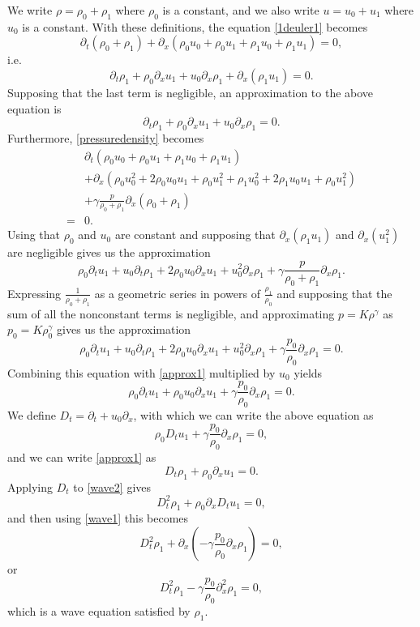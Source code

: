 \documentclass{article}
\theoremstyle{definition}
\begin{document}
We write $\rho=\rho_0+\rho_1$ where $\rho_0$ is a constant, and
we also write $u=u_0+u_1$ where $u_0$ is a constant. With these definitions, the equation \eqref{1deuler1} becomes
\[
\partial_t (\rho_0+\rho_1) + \partial_x(\rho_0u_0+\rho_0u_1+\rho_1 u_0+\rho_1u_1)=0,
\]
i.e.
\[
\partial_t \rho_1 + \rho_0 \partial_x u_1 + u_0 \partial_x \rho_1 + \partial_x(\rho_1u_1)=0.
\]
Supposing that the last term is negligible, an approximation to the above equation is
\begin{equation}
\partial_t \rho_1 + \rho_0 \partial_x u_1 + u_0 \partial_x \rho_1=0.
\label{approx1}
\end{equation}
Furthermore, \eqref{pressuredensity} becomes
\[
\begin{split}
&\partial_t(\rho_0u_0+\rho_0u_1+\rho_1 u_0+\rho_1u_1) \\
&+ \partial_x(\rho_0u_0^2+2\rho_0u_0u_1+\rho_0u_1^2+\rho_1u_0^2+2\rho_1 u_0u_1 + \rho_0u_1^2)\\
&+\gamma \frac{p}{\rho_0+\rho_1} \partial_x(\rho_0+\rho_1)\\
=&0.
\end{split}
\]
Using that  $\rho_0$ and $u_0$ are constant and supposing that  $\partial_x(\rho_1 u_1)$ and $\partial_x(u_1^2)$ are negligible gives us the approximation
\[
\rho_0 \partial_t u_1 + u_0 \partial_t \rho_1 + 2\rho_0u_0 \partial_x u_1 + u_0^2 \partial_x \rho_1 + \gamma \frac{p}{\rho_0+\rho_1} \partial_x \rho_1.
\]
Expressing $\frac{1}{\rho_0+\rho_1}$ as a geometric series in powers of $\frac{\rho_1}{\rho_0}$ and supposing that
the sum of all the nonconstant terms is negligible, and approximating $p=K\rho^\gamma$ as $p_0=K\rho_0^\gamma$
gives us the approximation
\[
\rho_0 \partial_t u_1 + u_0 \partial_t \rho_1 + 2\rho_0u_0 \partial_x u_1 + u_0^2 \partial_x \rho_1 + \gamma \frac{p_0}{\rho_0} \partial_x \rho_1=0.
\]
Combining this equation with \eqref{approx1} multiplied by $u_0$ yields
\[
\rho_0\partial_t u_1 + \rho_0 u_0 \partial_x u_1 + \gamma \frac{p_0}{\rho_0}\partial_x \rho_1=0.
\]
We define $D_t = \partial_t + u_0 \partial_x$, with which we can write the above equation as
\begin{equation}
\rho_0 D_t u_1+\gamma \frac{p_0}{\rho_0} \partial_x \rho_1=0,
\label{wave1}
\end{equation}
and we can write \eqref{approx1} as
\begin{equation}
D_t \rho_1 + \rho_0 \partial_x u_1=0.
\label{wave2}
\end{equation}
Applying $D_t$ to \eqref{wave2}  gives
\[
D_t^2 \rho_1 + \rho_0 \partial_x D_t u_1 =0,
\]
and then using \eqref{wave1} this becomes
\[
D_t^2 \rho_1 + \partial_x \left( -\gamma \frac{p_0}{\rho_0} \partial_x \rho_1 \right) =0,
\]
or
\[
D_t^2 \rho_1 - \gamma \frac{p_0}{\rho_0} \partial_x^2 \rho_1 =0,
\]
which is a wave equation satisfied by $\rho_1$. 
\end{document}
